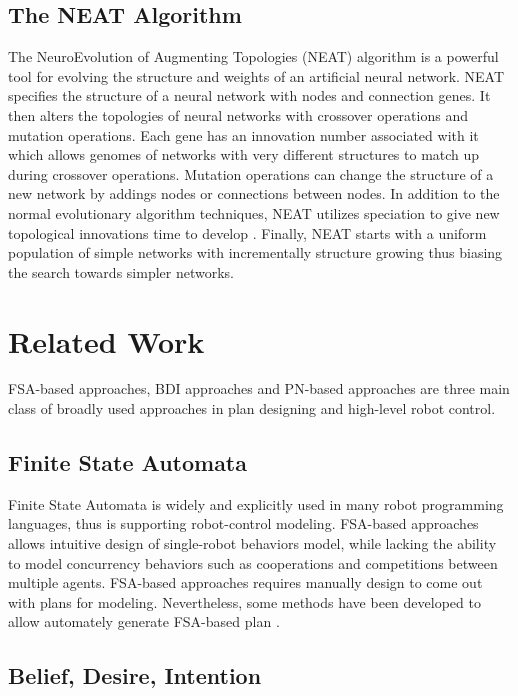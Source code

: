 \documentclass[12pt,a4paper,twocolumn]{article}
\begin{document}
\subsection{The NEAT Algorithm}

The NeuroEvolution of Augmenting Topologies (NEAT) algorithm is a powerful tool for evolving the structure and weights of an artificial neural network. NEAT specifies the structure of a neural network with nodes and connection genes. It then alters the topologies of neural networks with crossover operations and mutation operations. Each gene has an innovation number associated with it which allows genomes of networks with very different structures to match up during crossover operations. Mutation operations can change the structure of a new network by addings nodes or connections between nodes. In addition to the normal evolutionary algorithm techniques, NEAT utilizes speciation to give new topological innovations time to develop \cite{neat}. Finally, NEAT starts with a uniform population of simple networks with incrementally structure growing thus biasing the search towards simpler networks.

\section{Related Work}
FSA-based approaches, BDI approaches and PN-based approaches are three main class of broadly used approaches in plan designing and high-level robot control.

\subsection{Finite State Automata}

Finite State Automata is widely and explicitly used in many robot programming languages, thus is supporting robot-control modeling. FSA-based approaches allows intuitive design of single-robot behaviors model, while lacking the ability to model concurrency behaviors such as cooperations and competitions between multiple agents. FSA-based approaches requires manually design to come out with plans for modeling. Nevertheless, some methods have been developed to allow automately generate FSA-based plan \cite{kress2009temporal}.  

\subsection{Belief, Desire, Intention}
\end{document}
